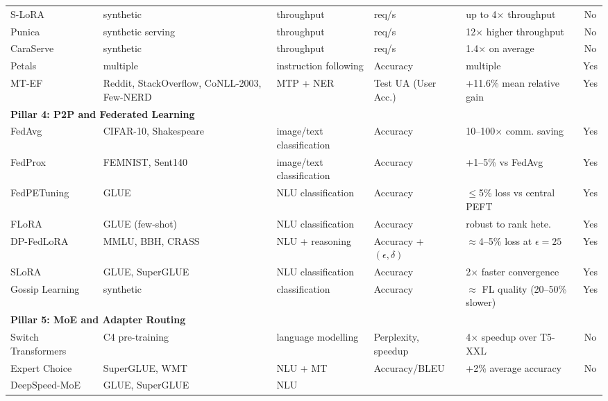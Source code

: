 \begin{table}
{\begin{tabular}{lllllc}
  S-LoRA~\citep{Sheng2024} & synthetic & throughput & req/s & up to 4$\times$
  throughput & No \\
  Punica~\citep{Chen2023Punica} & synthetic serving & throughput & req/s &
  12$\times$ higher throughput & No \\
  CaraServe~\citep{Li2024CaraServe} & synthetic & throughput & req/s &
  1.4$\times$ on average & No \\
  Petals~\citep{Borzunov2023} & multiple & instruction following & Accuracy &
  multiple & Yes \\
  MT-EF~\citep{Sajina2024} & Reddit, StackOverflow, CoNLL-2003, Few-NERD & MTP +
   NER & Test UA (User Acc.) & +11.6\% mean relative gain & Yes \\
  \midrule
  \multicolumn{6}{l}{\textbf{Pillar 4: P2P and Federated Learning}} \\
  FedAvg~\citep{McMahan2017} & CIFAR-10, Shakespeare & image/text classification
   & Accuracy & 10--100$\times$ comm. saving & Yes \\
  FedProx~\citep{Li2020FedProx} & FEMNIST, Sent140 & image/text classification &
   Accuracy & +1--5\% vs FedAvg & Yes \\
  FedPETuning~\citep{ZhangFedPETuning2023} & GLUE & NLU classification &
  Accuracy & $\leq$5\% loss vs central PEFT & Yes \\
  FLoRA~\citep{WangFLoRA2024} & GLUE (few-shot) & NLU classification & Accuracy
  & robust to rank hete. & Yes \\
DP-FedLoRA~\citep{XuDPFedLoRA2025} & MMLU, BBH, CRASS & NLU + reasoning & Accuracy + $(\epsilon,\delta)$ & $\approx$4--5\% loss at $\epsilon=25$ & Yes \\
  SLoRA~\citep{Babakniya2023} & GLUE, SuperGLUE & NLU classification & Accuracy
  & 2$\times$ faster convergence & Yes \\
  Gossip Learning~\citep{HegeduisGossip2019} & synthetic & classification &
  Accuracy & $\approx$ FL quality (20--50\% slower) & Yes \\
  \midrule
  \multicolumn{6}{l}{\textbf{Pillar 5: MoE and Adapter Routing}} \\
  Switch Transformers~\citep{Fedus2022} & C4 pre-training & language modelling &
   Perplexity, speedup & 4$\times$ speedup over T5-XXL & No \\
  Expert Choice~\citep{Zhou2022} & SuperGLUE, WMT & NLU + MT & Accuracy/BLEU &
  +2\% average accuracy & No \\
  DeepSpeed-MoE~\citep{RajbhandariDeepSpeed2022} & GLUE, SuperGLUE & NLU

\end{tabular}}
\end{table}

